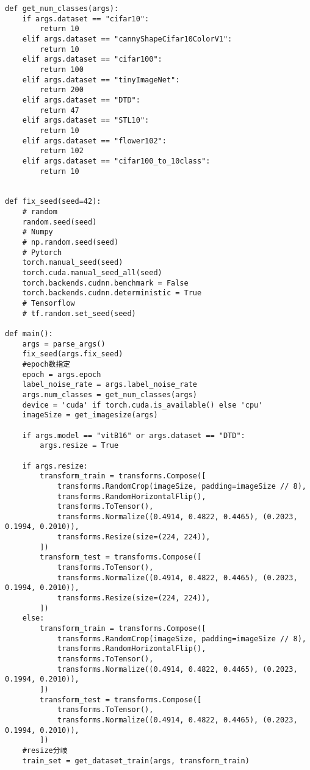 {\begin{verbatim}
def get_num_classes(args):
    if args.dataset == "cifar10":
        return 10
    elif args.dataset == "cannyShapeCifar10ColorV1":
        return 10
    elif args.dataset == "cifar100":
        return 100
    elif args.dataset == "tinyImageNet":
        return 200
    elif args.dataset == "DTD":
        return 47
    elif args.dataset == "STL10":
        return 10
    elif args.dataset == "flower102":
        return 102
    elif args.dataset == "cifar100_to_10class":
        return 10
    

def fix_seed(seed=42):
    # random
    random.seed(seed)
    # Numpy
    # np.random.seed(seed)
    # Pytorch
    torch.manual_seed(seed) 
    torch.cuda.manual_seed_all(seed)
    torch.backends.cudnn.benchmark = False
    torch.backends.cudnn.deterministic = True
    # Tensorflow
    # tf.random.set_seed(seed)

def main():
    args = parse_args()
    fix_seed(args.fix_seed)
    #epoch数指定
    epoch = args.epoch
    label_noise_rate = args.label_noise_rate
    args.num_classes = get_num_classes(args)
    device = 'cuda' if torch.cuda.is_available() else 'cpu'
    imageSize = get_imagesize(args)

    if args.model == "vitB16" or args.dataset == "DTD":
        args.resize = True

    if args.resize:
        transform_train = transforms.Compose([
            transforms.RandomCrop(imageSize, padding=imageSize // 8),
            transforms.RandomHorizontalFlip(),
            transforms.ToTensor(),
            transforms.Normalize((0.4914, 0.4822, 0.4465), (0.2023, 0.1994, 0.2010)),
            transforms.Resize(size=(224, 224)),
        ])
        transform_test = transforms.Compose([
            transforms.ToTensor(),
            transforms.Normalize((0.4914, 0.4822, 0.4465), (0.2023, 0.1994, 0.2010)),
            transforms.Resize(size=(224, 224)),
        ])
    else:
        transform_train = transforms.Compose([
            transforms.RandomCrop(imageSize, padding=imageSize // 8),
            transforms.RandomHorizontalFlip(),
            transforms.ToTensor(),
            transforms.Normalize((0.4914, 0.4822, 0.4465), (0.2023, 0.1994, 0.2010)),
        ])
        transform_test = transforms.Compose([
            transforms.ToTensor(),
            transforms.Normalize((0.4914, 0.4822, 0.4465), (0.2023, 0.1994, 0.2010)),
        ])
    #resize分岐
    train_set = get_dataset_train(args, transform_train)


\end{verbatim}}
